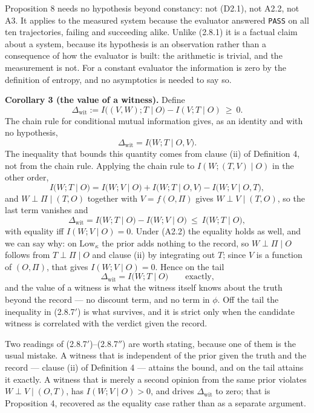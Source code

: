 \documentclass[11pt,a4paper]{article}
\begin{document}
Proposition 8 needs no hypothesis beyond constancy: not (D2.1), not A2.2, not A3.
It applies to the measured system because the evaluator answered \texttt{PASS} on all ten
trajectories, failing and succeeding alike. Unlike (2.8.1) it is a factual claim
about a system, because its hypothesis is an observation rather than a consequence
of how the evaluator is built: the arithmetic is trivial, and the measurement is
not. For a constant evaluator the information is zero by the definition of
entropy, and no asymptotics is needed to say so.

\textbf{Corollary 3 (the value of a witness).} Define
\begin{equation}
\Delta_{\mathrm{wit}}:=I\big((V,W);T\mid O\big)-I(V;T\mid O)\ \ge\ 0 .
\tag{2.8.6}
\end{equation}
The chain rule for conditional mutual information gives, as an identity and with no
hypothesis,
\begin{equation}
\Delta_{\mathrm{wit}}=I\big(W;T\mid O,V\big).
\tag{2.8.7}
\end{equation}
The inequality that bounds this quantity comes from clause (ii) of Definition 4,
not from the chain rule. Applying the chain rule to \(I(W;(T,V)\mid O)\) in the other
order,
\[
I\big(W;T\mid O\big)
=I\big(W;V\mid O\big)+I\big(W;T\mid O,V\big)-I\big(W;V\mid O,T\big),
\]
and \(W\perp\Pi\mid(T,O)\) together with \(V=f(O,\Pi)\) gives \(W\perp V\mid(T,O)\), so
the last term vanishes and
\begin{equation}
\Delta_{\mathrm{wit}}=I\big(W;T\mid O\big)-I\big(W;V\mid O\big)\ \le\ I\big(W;T\mid O\big),
\tag{2.8.7'}
\end{equation}
with equality iff \(I(W;V\mid O)=0\). Under (A2.2) the equality holds as well, and we
can say why: on \(\mathrm{Low}_\kappa\) the prior adds nothing to the record, so
\(W\perp\Pi\mid O\) follows from \(T\perp\Pi\mid O\) and clause (ii) by integrating out
\(T\); since \(V\) is a function of \((O,\Pi)\), that gives \(I(W;V\mid O)=0\). Hence on the
tail
\begin{equation}
\Delta_{\mathrm{wit}}=I\big(W;T\mid O\big)\qquad\text{exactly,}
\tag{2.8.7''}
\end{equation}
and the value of a witness is what the witness itself knows about the truth beyond
the record --- no discount term, and no term in \(\phi\). Off the tail the inequality
in (2.8.7\('\)) is what survives, and it is strict only when the candidate witness is
correlated with the verdict given the record.

Two readings of (2.8.7\('\))--(2.8.7\(''\)) are worth stating, because one of them is
the usual mistake. A witness that is independent of the prior given the truth and
the record --- clause (ii) of Definition 4 --- attains the bound, and on the tail
attains it exactly. A witness that is merely a second opinion from the same prior
violates \(W\perp V\mid(O,T)\), has \(I(W;V\mid O)>0\), and drives
\(\Delta_{\mathrm{wit}}\) to zero; that is Proposition 4, recovered as the equality
case rather than as a separate argument.
\end{document}

